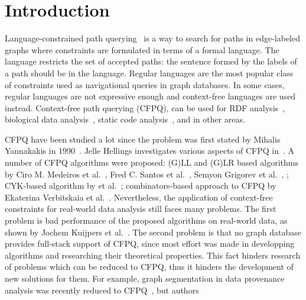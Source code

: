 \section{Introduction}

Language-constrained path querying~\cite{doi:10.1137/S0097539798337716} is a way to search for paths in edge-labeled graphs where constraints are formulated in terms of a formal language.
The language restricts the set of accepted paths: the sentence formed by the labels of a path should be in the language.
Regular languages are the most popular class of constraints used as navigational queries in graph databases.
In some cases, regular languages are not expressive enough and context-free languages are used instead.
Context-free path querying (CFPQ), can be used for RDF analysis~\cite{10.1007/978-3-319-46523-4_38}, biological data analysis~\cite{SubgraphQueriesbyContextfreeGrammars}, static code analysis~\cite{Zheng,10.1145/373243.360208}, and in other areas.

CFPQ have been studied a lot since the problem was first stated by Mihalis Yannakakis in 1990~\cite{Yannakakis}.
Jelle Hellings investigates various aspects of CFPQ in~\cite{hellingsPathQuerying,hellingsRelational,DBLP:journals/corr/Hellings15}.
A number of CFPQ algorithms were proposed: (G)LL and (G)LR based algorithms by Ciro M. Medeiros et al.~\cite{Medeiros:2018:EEC:3167132.3167265}, Fred C. Santos et al.~\cite{10.1007/978-3-319-91662-0_17}, Semyon Grigorev et al.~\cite{Grigorev:2017:CPQ:3166094.3166104}, ; CYK-based algorithm by  et al.~\cite{RDF}; combinators-based approach to CFPQ by Ekaterina Verbitskaia et al.~\cite{Verbitskaia:2018:PCC:3241653.3241655}.
Nevertheless, the application of context-free constraints for real-world data analysis still faces many problems.
The first problem is bad performance of the proposed algorithms on real-world data, as shown by Jochem Kuijpers et al.~\cite{Kuijpers:2019:ESC:3335783.3335791}.
The second problem is that no graph database provides full-stack support of CFPQ, since most effort was made in developping algorithms and researching their theoretical properties.
This fact hinders research of problems which can be reduced to CFPQ, thus it hinders the development of new solutions for them.
For example, graph segmentation in data provenance analysis was recently reduced to CFPQ~\cite{8731467}, but authors 

